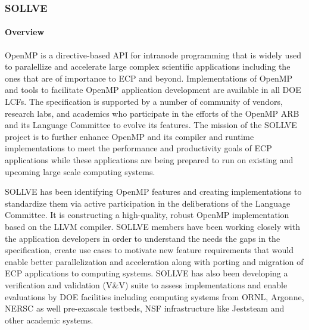 \subsubsection{ SOLLVE}\label{subsubsect:sollve}


\paragraph{Overview}
OpenMP is a directive-based API for intranode programming that is widely used  to paralellize and accelerate large complex scientific applications including the ones that are of importance to ECP and beyond. Implementations of OpenMP and  tools to facilitate OpenMP application development are available in all DOE LCFs. The specification is supported by a number of community of vendors, research labs, and academics who participate in the efforts of the OpenMP ARB and its Language Committee to evolve its features. The mission of the SOLLVE project is to further enhance OpenMP and its compiler and runtime implementations to meet the performance and productivity goals of ECP applications while these applications are being prepared to run on existing and upcoming large scale computing systems. 

SOLLVE has been identifying OpenMP features and creating implementations to standardize them via active participation in the deliberations of the Language Committee. It is constructing a high-quality, robust OpenMP implementation based on the LLVM compiler. SOLLVE members have been working closely with the application developers in order to understand the needs the gaps in the specification, create use cases to motivate new feature requirements that would enable better parallelization and acceleration along with porting and migration of ECP applications to computing systems. SOLLVE has also been developing a verification and validation (V\&V) suite to assess implementations and enable evaluations by DOE facilities including computing systems from ORNL, Argonne, NERSC as well pre-exascale testbeds, NSF infrastructure like Jeststeam and other academic systems. 

